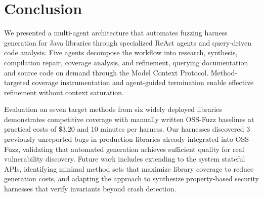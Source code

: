 \documentclass[sigconf,review,anonymous]{acmart}
\begin{document}



\maketitle









\section{Conclusion}

We presented a multi-agent architecture that automates fuzzing harness generation for Java libraries through specialized ReAct agents and query-driven code analysis. Five agents decompose the workflow into research, synthesis, compilation repair, coverage analysis, and refinement, querying documentation and source code on demand through the Model Context Protocol. Method-targeted coverage instrumentation and agent-guided termination enable effective refinement without context saturation.

Evaluation on seven target methods from six widely deployed libraries demonstrates competitive coverage with manually written OSS-Fuzz baselines at practical costs of \$3.20 and 10 minutes per harness. Our harnesses discovered 3 previously unreported bugs in production libraries already integrated into OSS-Fuzz, validating that automated generation achieves sufficient quality for real vulnerability discovery. Future work includes extending to the system stateful APIs, identifying minimal method sets that maximize library coverage to reduce generation costs, and adapting the approach to synthesize property-based security harnesses that verify invariants beyond crash detection.

%



\end{document}
